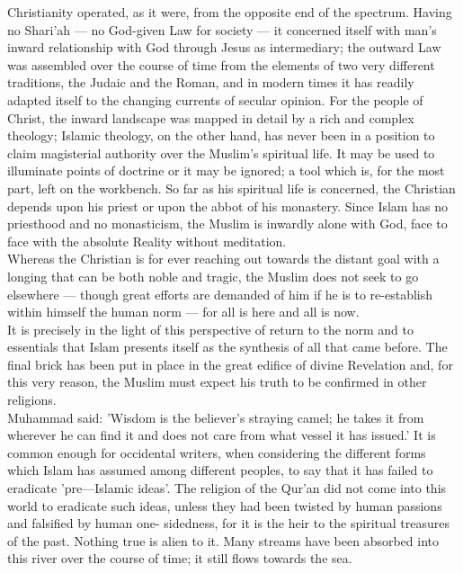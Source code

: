 \documentclass[11pt, b5paper, twoside]{book}
\begin{document}
Christianity operated, as it were, from the opposite end of the spectrum. Having no Shari'ah --- no 
God-given Law for society --- it concerned itself with man's inward relationship with God through Jesus 
as intermediary; the outward Law was assembled over the course of time from the elements of two very 
different traditions, the Judaic and the Roman, and in modern times it has readily adapted itself to 
the changing currents of secular opinion. For the people of Christ, the inward landscape was mapped 
in detail by a rich and complex theology; Islamic theology, on the other hand, has never been in a 
position to claim magisterial authority over the Muslim's spiritual life. It may be used to 
illuminate points of doctrine or it may be ignored; a tool which is, for the most part, left on the 
workbench. So far as his spiritual life is concerned, the Christian depends upon his priest or upon 
the abbot of his monastery. Since Islam has no priesthood and no monasticism, the Muslim is inwardly 
alone with God, face to face with the absolute Reality without meditation. \\

Whereas the Christian is for ever reaching out towards the distant goal with a longing that can be 
both noble and tragic, the Muslim does not seek to go elsewhere --- though great efforts are demanded 
of him if he is to re-establish within himself the human norm --- for all is here and all is now. \\

It is precisely in the light of this perspective of return to the norm and to essentials that Islam 
presents itself as the synthesis of all that came before. The final brick has been put in place in 
the great edifice of divine Revelation and, for this very reason, the Muslim must expect his truth to 
be confirmed in other religions. \\

Muhammad said: 'Wisdom is the believer's straying camel; he takes it from wherever he can find it and 
does not care from what vessel it has issued.' It is common enough for occidental writers, when 
considering the different forms which Islam has assumed among different peoples, to say that it has 
failed to eradicate 'pre---Islamic ideas'. The religion of the Qur'an did not come into this world to 
eradicate such ideas, unless they had been twisted by human passions and falsified by human one-
sidedness, for it is the heir to the spiritual treasures of the past. Nothing true is alien to it. 
Many streams have been absorbed into this river over the course of time; it still flows towards the 
sea. \\
\end{document}
